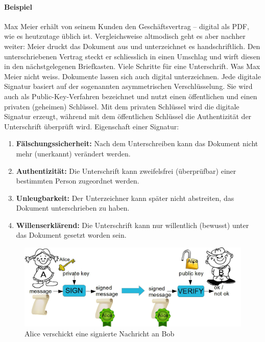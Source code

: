 \documentclass[10pt,a4paper]{article}
\begin{document}
\paragraph*{Beispiel}Max Meier erhält von seinem Kunden den Geschäftsvertrag – digital als PDF, wie es heutzutage üblich ist. Vergleichsweise altmodisch geht es aber nachher weiter: Meier druckt das Dokument aus und unterzeichnet es handschriftlich. Den unterschriebenen Vertrag steckt er schliesslich in einen Umschlag und wirft diesen in den nächstgelegenen Briefkasten. Viele Schritte für eine Unterschrift.\newline
Was Max Meier nicht weiss. Dokumente lassen sich auch digital unterzeichnen. Jede digitale Signatur basiert auf der sogenannten asymmetrischen Verschlüsselung. Sie wird auch als Public-Key-Verfahren bezeichnet und nutzt einen öffentlichen und einen privaten (geheimen) Schlüssel. Mit dem privaten Schlüssel wird die digitale Signatur erzeugt, während mit dem öffentlichen Schlüssel die Authentizität der Unterschrift überprüft wird.\newline %
Eigenschaft einer Signatur:
\begin{enumerate}[noitemsep,topsep=0pt,leftmargin=*]
    \item \textbf{Fälschungssicherheit:} Nach dem Unterschreiben kann das Dokument nicht mehr (unerkannt) verändert werden.
    \item \textbf{Authentizität:} Die Unterschrift kann zweifelsfrei (überprüfbar) einer bestimmten Person zugeordnet werden.
    \item \textbf{Unleugbarkeit:} Der Unterzeichner kann später nicht abstreiten, das Dokument unterschrieben zu haben.
    \item \textbf{Willenserklärend:} Die Unterschrift kann nur willentlich (bewusst) unter das Dokument gesetzt worden sein.
\end{enumerate}
\begin{figure}[H]
    \begin{center}
    \includegraphics[width=12cm]{images/digisignatur0.png}
    \caption{Alice verschickt eine signierte Nachricht an Bob}
    \label{digisig0}
    \end{center}
\end{figure}
\end{document}
